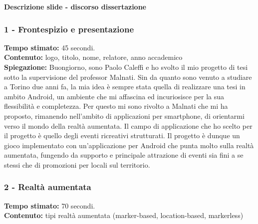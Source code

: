 \documentclass[
	twoside]				%
	{toptesi}				%
\begin{document}
	
	\mainmatter
	
	\textbf{\LARGE{Descrizione slide - discorso dissertazione}}
	
	\subsubsection{1 - Frontespizio e presentazione}
	
	\textbf{Tempo stimato:} 45 secondi. \\
	
	\textbf{Contenuto:} logo, titolo, nome, relatore, anno accademico \\

	\textbf{Spiegazione:} Buongiorno, sono Paolo Caleffi e ho svolto il mio progetto di tesi sotto la supervisione del professor Malnati.
	Sin da quanto sono venuto a studiare a Torino due anni fa, la mia idea è sempre stata quella di realizzare una tesi in ambito Android, un ambiente che mi affascina ed incuriosisce per la sua flessibilità e completezza.
	Per questo mi sono rivolto a Malnati che mi ha proposto, rimanendo nell'ambito di applicazioni per smartphone, di orientarmi verso il mondo della realtà aumentata.
	Il campo di applicazione che ho scelto per il progetto è quello degli eventi ricreativi strutturati.
	Il progetto è dunque un gioco implementato con un'applicazione per Android che punta molto sulla realtà aumentata, fungendo da supporto e principale attrazione di eventi sia fini a se stessi che di promozioni per locali sul territorio.

	\subsubsection{2 - Realtà aumentata}

	\textbf{Tempo stimato:} 70 secondi. \\
	
	\textbf{Contenuto:} tipi realtà aumentata (marker-based, location-based, markerless) \\
	
\end{document}
